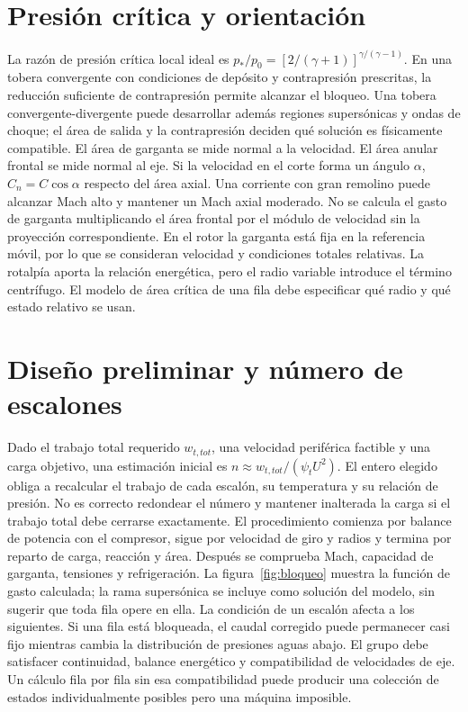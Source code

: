 \documentclass[10pt,openany]{book}
\begin{document}
\section{Presión crítica y orientación}

La razón de presión crítica local ideal es \(p_*/p_0=[2/(\gamma+1)]^{\gamma/(\gamma-1)}\). En una tobera convergente con condiciones de depósito y contrapresión prescritas, la reducción suficiente de contrapresión permite alcanzar el bloqueo. Una tobera convergente-divergente puede desarrollar además regiones supersónicas y ondas de choque; el área de salida y la contrapresión deciden qué solución es físicamente compatible.
El área de garganta se mide normal a la velocidad. El área anular frontal se mide normal al eje. Si la velocidad en el corte forma un ángulo \(\alpha\), \(C_n=C\cos\alpha\) respecto del área axial. Una corriente con gran remolino puede alcanzar Mach alto y mantener un Mach axial moderado. No se calcula el gasto de garganta multiplicando el área frontal por el módulo de velocidad sin la proyección correspondiente.
En el rotor la garganta está fija en la referencia móvil, por lo que se consideran velocidad y condiciones totales relativas. La rotalpía aporta la relación energética, pero el radio variable introduce el término centrífugo. El modelo de área crítica de una fila debe especificar qué radio y qué estado relativo se usan.

\section{Diseño preliminar y número de escalones}

Dado el trabajo total requerido \(w_{t,tot}\), una velocidad periférica factible y una carga objetivo, una estimación inicial es \(n\approx w_{t,tot}/(\psi_tU^2)\). El entero elegido obliga a recalcular el trabajo de cada escalón, su temperatura y su relación de presión. No es correcto redondear el número y mantener inalterada la carga si el trabajo total debe cerrarse exactamente.
El procedimiento comienza por balance de potencia con el compresor, sigue por velocidad de giro y radios y termina por reparto de carga, reacción y área. Después se comprueba Mach, capacidad de garganta, tensiones y refrigeración. La figura~\ref{fig:bloqueo} muestra la función de gasto calculada; la rama supersónica se incluye como solución del modelo, sin sugerir que toda fila opere en ella.
La condición de un escalón afecta a los siguientes. Si una fila está bloqueada, el caudal corregido puede permanecer casi fijo mientras cambia la distribución de presiones aguas abajo. El grupo debe satisfacer continuidad, balance energético y compatibilidad de velocidades de eje. Un cálculo fila por fila sin esa compatibilidad puede producir una colección de estados individualmente posibles pero una máquina imposible.
\end{document}
